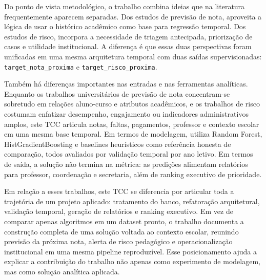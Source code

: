 Do ponto de vista metodol\'ogico, o trabalho combina ideias que na literatura frequentemente aparecem separadas. Dos estudos de previs\~ao de nota, aproveita a l\'ogica de usar o hist\'orico acad\^emico como base para regress\~ao temporal. Dos estudos de risco, incorpora a necessidade de triagem antecipada, prioriza\c{c}\~ao de casos e utilidade institucional. A diferen\c{c}a \'e que essas duas perspectivas foram unificadas em uma mesma arquitetura temporal com duas sa\'idas supervisionadas: \texttt{target\_nota\_proxima} e \texttt{target\_risco\_proxima}.

Tamb\'em h\'a diferen\c{c}as importantes nas entradas e nas ferramentas anal\'iticas. Enquanto os trabalhos universit\'arios de previs\~ao de nota concentram-se sobretudo em rela\c{c}\~oes aluno-curso e atributos acad\^emicos, e os trabalhos de risco costumam enfatizar desempenho, engajamento ou indicadores administrativos amplos, este TCC articula notas, faltas, pagamentos, professor e contexto escolar em uma mesma base temporal. Em termos de modelagem, utiliza Random Forest, HistGradientBoosting e baselines heur\'isticos como refer\^encia honesta de compara\c{c}\~ao, todos avaliados por valida\c{c}\~ao temporal por ano letivo. Em termos de sa\'ida, a solu\c{c}\~ao n\~ao termina na m\'etrica: as predi\c{c}\~oes alimentam relat\'orios para professor, coordena\c{c}\~ao e secretaria, al\'em de ranking executivo de prioridade.

Em rela\c{c}\~ao a esses trabalhos, este TCC se diferencia por articular toda a trajet\'oria de um projeto aplicado: tratamento do banco, refatora\c{c}\~ao arquitetural, valida\c{c}\~ao temporal, gera\c{c}\~ao de relat\'orios e ranking executivo. Em vez de comparar apenas algoritmos em um dataset pronto, o trabalho documenta a constru\c{c}\~ao completa de uma solu\c{c}\~ao voltada ao contexto escolar, reunindo previs\~ao da pr\'oxima nota, alerta de risco pedag\'ogico e operacionaliza\c{c}\~ao institucional em uma mesma pipeline reproduz\'ivel. Esse posicionamento ajuda a explicar a contribui\c{c}\~ao do trabalho n\~ao apenas como experimento de modelagem, mas como solu\c{c}\~ao anal\'itica aplicada.
